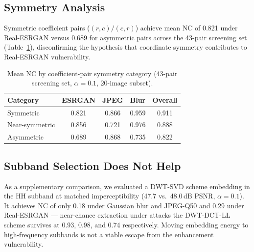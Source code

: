 \documentclass[conference]{IEEEtran}
\begin{document}
\subsection{Symmetry Analysis}

Symmetric coefficient pairs ($(r,c)/(c,r)$) achieve mean NC of 0.821
under Real-ESRGAN versus 0.689 for asymmetric pairs across the 43-pair
screening set (Table~\ref{tab:symmetry}), disconfirming the hypothesis
that coordinate symmetry contributes to Real-ESRGAN vulnerability.

\begin{table}[t]
\caption{Mean NC by coefficient-pair symmetry category (43-pair
screening set, $\alpha=0.1$, 20-image subset).}
\label{tab:symmetry}
\centering
\begin{tabular}{lcccc}
\toprule
Category & ESRGAN & JPEG & Blur & Overall \\
\midrule
Symmetric      & 0.821 & 0.866 & 0.959 & 0.911 \\
Near-symmetric & 0.856 & 0.721 & 0.976 & 0.888 \\
Asymmetric     & 0.689 & 0.868 & 0.735 & 0.822 \\
\bottomrule
\end{tabular}
\end{table}

\subsection{Subband Selection Does Not Help}
As a supplementary comparison, we evaluated a DWT-SVD scheme embedding
in the HH subband at matched imperceptibility (47.7 vs.\ 48.0\,dB
PSNR, $\alpha=0.1$). It achieves NC of only 0.18 under Gaussian blur
and JPEG-Q50 and
0.29 under Real-ESRGAN --- near-chance extraction under attacks
the DWT-DCT-LL scheme survives at 0.93, 0.98, and 0.74 respectively.
Moving embedding energy to high-frequency subbands is not a viable
escape from the enhancement vulnerability.
\end{document}
